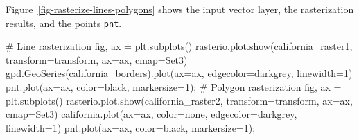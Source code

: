 \documentclass[
  letterpaper,
]{krantz}
\newenvironment{Shaded}{\begin{snugshade}}{\end{snugshade}}
\newcommand{\CommentTok}[1]{\textcolor[rgb]{0.37,0.37,0.37}{#1}}
\newcommand{\DecValTok}[1]{\textcolor[rgb]{0.68,0.00,0.00}{#1}}
\newcommand{\NormalTok}[1]{\textcolor[rgb]{0.00,0.23,0.31}{#1}}
\newcommand{\OperatorTok}[1]{\textcolor[rgb]{0.37,0.37,0.37}{#1}}
\newcommand{\StringTok}[1]{\textcolor[rgb]{0.13,0.47,0.30}{#1}}
\begin{document}
Figure~\ref{fig-rasterize-lines-polygons} shows the input vector layer,
the rasterization results, and the points \texttt{pnt}.

\begin{Shaded}
\begin{Highlighting}[]
\CommentTok{\# Line rasterization}
\NormalTok{fig, ax }\OperatorTok{=}\NormalTok{ plt.subplots()}
\NormalTok{rasterio.plot.show(california\_raster1, transform}\OperatorTok{=}\NormalTok{transform, ax}\OperatorTok{=}\NormalTok{ax, cmap}\OperatorTok{=}\StringTok{\textquotesingle{}Set3\textquotesingle{}}\NormalTok{)}
\NormalTok{gpd.GeoSeries(california\_borders).plot(ax}\OperatorTok{=}\NormalTok{ax, edgecolor}\OperatorTok{=}\StringTok{\textquotesingle{}darkgrey\textquotesingle{}}\NormalTok{, linewidth}\OperatorTok{=}\DecValTok{1}\NormalTok{)}
\NormalTok{pnt.plot(ax}\OperatorTok{=}\NormalTok{ax, color}\OperatorTok{=}\StringTok{\textquotesingle{}black\textquotesingle{}}\NormalTok{, markersize}\OperatorTok{=}\DecValTok{1}\NormalTok{)}\OperatorTok{;}
\CommentTok{\# Polygon rasterization}
\NormalTok{fig, ax }\OperatorTok{=}\NormalTok{ plt.subplots()}
\NormalTok{rasterio.plot.show(california\_raster2, transform}\OperatorTok{=}\NormalTok{transform, ax}\OperatorTok{=}\NormalTok{ax, cmap}\OperatorTok{=}\StringTok{\textquotesingle{}Set3\textquotesingle{}}\NormalTok{)}
\NormalTok{california.plot(ax}\OperatorTok{=}\NormalTok{ax, color}\OperatorTok{=}\StringTok{\textquotesingle{}none\textquotesingle{}}\NormalTok{, edgecolor}\OperatorTok{=}\StringTok{\textquotesingle{}darkgrey\textquotesingle{}}\NormalTok{, linewidth}\OperatorTok{=}\DecValTok{1}\NormalTok{)}
\NormalTok{pnt.plot(ax}\OperatorTok{=}\NormalTok{ax, color}\OperatorTok{=}\StringTok{\textquotesingle{}black\textquotesingle{}}\NormalTok{, markersize}\OperatorTok{=}\DecValTok{1}\NormalTok{)}\OperatorTok{;}
\end{Highlighting}
\end{Shaded}
\end{document}
